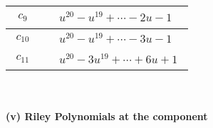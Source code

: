 \documentclass[1p]{elsarticle_modified}
\theoremstyle{definition}
\begin{document}
\begin{tabular}{m{50pt}|m{274pt}}
\hline $$\begin{aligned}c_{9}\end{aligned}$$&$\begin{aligned}
&u^{20}- u^{19}+\cdots-2 u-1
\end{aligned}$\\
\hline $$\begin{aligned}c_{10}\end{aligned}$$&$\begin{aligned}
&u^{20}- u^{19}+\cdots-3 u-1
\end{aligned}$\\
\hline $$\begin{aligned}c_{11}\end{aligned}$$&$\begin{aligned}
&u^{20}-3 u^{19}+\cdots+6 u+1
\end{aligned}$\\
\hline
\end{tabular}\\~\\
\newpage\renewcommand{\arraystretch}{1}
\flushleft \textbf{(v) Riley Polynomials at the component}\newline \\
\end{document}

